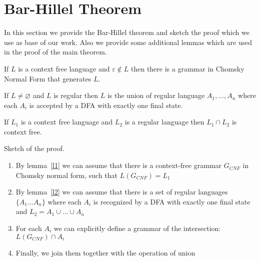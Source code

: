 \section{Bar-Hillel Theorem}
\label{sec:b-h-th}

In this section we provide the Bar-Hillel theorem and sketch the proof which we use as base of our work.
Also we provide some additional lemmas which are used in the proof of the main theorem.

\begin{lemma} \label{l1}
	If $L$ is a context free language and $\varepsilon \notin L$ then there is a grammar in Chomsky Normal Form that generates $L$.
\end{lemma}

\begin{lemma} \label{l2}
	If $ L \neq \varnothing $ and $L$ is regular then $L$ is the union of regular language $A_1, \ldots , A_n$ where each $A_i$ is accepted by a DFA with exactly one final state.
\end{lemma}

\begin{theorem}
	If $L_1$ is a context free language and $L_2$ is a regular language then $L_1 \cap L_2$ is context free.
\end{theorem}


Sketch of the proof.
\begin{enumerate}
	\item By lemma~\ref{l1} we can assume that there is a context-free grammar $G_{CNF}$ in Chomsky normal form, such that $L(G_{CNF}) = L_1$
	\item By lemma~\ref{l2} we can assume that there is a set of regular languages $\{A_{1} \ldots A_n \}$ where each $A_i$ is recognized by a DFA with exactly one final state and $L_2 = A_1 \cup \ldots \cup A_n$
	\item For each $A_i$ we can explicitly define a grammar of the intersection: $L( G_{CNF} ) \cap A_i$
	\item Finally, we join them together with the operation of union
\end{enumerate}
